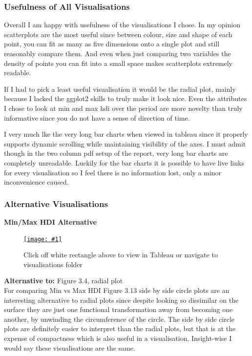 \documentclass[11pt,a4paper,final]{article}
\newcommand\onlinefig[3]{
\begin{figure}[H]
  \centering
  \href{#3}{\texttt{[image: \#1]}}
  \caption{#2} 
  \label{fig:#1}
\end{figure}
}
\begin{document}
\begin{multicols}{2}
\subsubsection{Usefulness of All Visualisations}
Overall I am happy with usefulness of the visualisations I chose. In my opinion scatterplots are the most useful since between colour, size and shape of each point, you can fit as many as five dimensions onto a single plot and still reasonably compare them. And even when just comparing two variables the density of points you can fit into a small space makes scatterplots extremely readable.

If I had to pick a least useful visualisation it would be the radial plot, mainly because I lacked the ggplot2 skills to truly make it look nice. Even the attributes I chose to look at min and max hdi over the period are more novelty than truly informative since you do not have a sense of direction of time.

I very much lke the very long bar charts when viewed in tableau since it properly supports dynamic scrolling while maintaining visibility of the axes. I must admit though in the two column pdf setup of the report, very long bar charts are completely unreadable. Luckily for the bar charts it is possible to have live links for every visualisation so I feel there is no information lost, only a minor inconvenience caused.
\vfill\null
\columnbreak

\subsubsection{Alternative Visualisations}
\begin{flushleft}
\textbf{Min/Max HDI Alternative}
\end{flushleft}
\onlinefig{min_vs_max_hdi_sidebysidecircleplot}{Click off white rectangle above to view in Tableau or navigate to visualisations folder}{https://public.tableau.com/views/CS3205_hdi_csv/Sheet1?:language=en-GB&:display_count=n&:origin=viz_share_link}

\textbf{Alternative to:} Figure 3.4, radial plot
\\
For comparing Min vs Max HDI Figure 3.13 side by side circle plots are an interesting alternative to radial plots since despite looking so dissimilar on the surface they are just one functional transformation away from becoming one another, by unwinding the circumference of the circle.
The side by side circle plots are definitely easier to interpret than the radial plots, but that is at the expense of compactness which is also useful in a visualisation. Insight-wise I would say these visualisations are the same.


\end{multicols}
\end{document}
